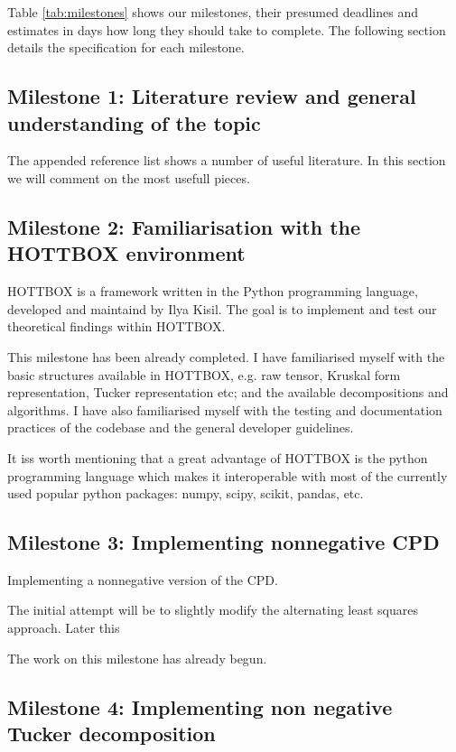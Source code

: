 \documentclass{article}
\begin{document}
Table \ref{tab:milestones} shows our milestones, their presumed deadlines and estimates in days how long they should take to complete. The following section details the specification for each milestone.

\subsection{Milestone 1: Literature review and general understanding of the topic}

The appended reference list shows a number of useful literature. In this section we will comment on the most usefull pieces.

\subsection{Milestone 2: Familiarisation with the HOTTBOX environment}

HOTTBOX is a framework written in the Python programming language, developed and maintaind by Ilya Kisil. The goal is to implement and test our theoretical findings within HOTTBOX.

This milestone has been already completed. I have familiarised myself with the basic structures available in HOTTBOX, e.g. raw tensor, Kruskal form representation, Tucker representation etc; and the available decompositions and algorithms. I have also familiarised myself with the testing and documentation practices of the codebase and the general developer guidelines.

It iss worth mentioning that a great advantage of HOTTBOX is the python programming language which makes it interoperable with most of the currently used popular python packages: numpy, scipy, scikit, pandas, etc.




\subsection{Milestone 3: Implementing nonnegative CPD}
Implementing a nonnegative version of the CPD. 

The initial attempt will be to slightly modify the alternating least squares approach. Later this

The work on this milestone has already begun.

\subsection{Milestone 4: Implementing non negative Tucker decomposition}
\end{document}
